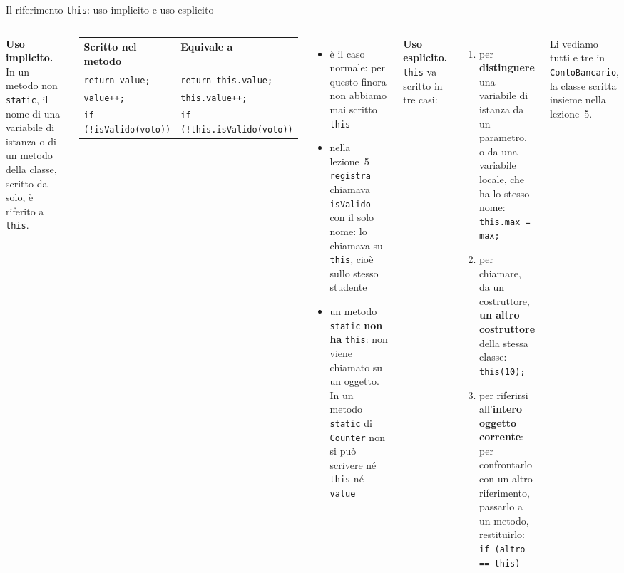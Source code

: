 \documentclass[10pt,aspectratio=169]{beamer}
\begin{document}
\begin{frame}{Il riferimento \texttt{this}: uso implicito e uso esplicito}
\begin{columns}[T]
\small
\textbf{Uso implicito.} In un metodo non \texttt{static}, il nome di una variabile di istanza o di un metodo della classe, scritto da solo, è riferito a \texttt{this}.

\begin{center}
\footnotesize
\renewcommand{\arraystretch}{1.2}
\begin{tabular}{@{}ll@{}}
\toprule
\textbf{Scritto nel metodo} & \textbf{Equivale a} \\
\midrule
\texttt{return value;} & \texttt{return this.value;} \\
\texttt{value++;} & \texttt{this.value++;} \\
\texttt{if (!isValido(voto))} & \texttt{if (!this.isValido(voto))} \\
\bottomrule
\end{tabular}
\end{center}

\begin{itemize}\itemsep=3pt
    \item è il caso normale: per questo finora non abbiamo mai scritto \texttt{this}
    \item nella lezione~5 \texttt{registra} chiamava \texttt{isValido} con il solo nome: lo chiamava su \texttt{this}, cioè sullo stesso studente
    \item un metodo \texttt{static} \textbf{non ha} \texttt{this}: non viene chiamato su un oggetto. In un metodo \texttt{static} di \texttt{Counter} non si può scrivere né \texttt{this} né \texttt{value}
\end{itemize}

\small
\textbf{Uso esplicito.} \texttt{this} va scritto in tre casi:
\begin{enumerate}\itemsep=5pt
    \item per \textbf{distinguere} una variabile di istanza da un parametro, o da una variabile locale, che ha lo stesso nome:\\ \texttt{this.max = max;}
    \item per chiamare, da un costruttore, \textbf{un altro costruttore} della stessa classe:\\ \texttt{this(10);}
    \item per riferirsi all'\textbf{intero oggetto corrente}: per confrontarlo con un altro riferimento, passarlo a un metodo, restituirlo:\\ \texttt{if (altro == this)}
\end{enumerate}

\vspace{0.2cm}
Li vediamo tutti e tre in \texttt{ContoBancario}, la classe scritta insieme nella lezione~5.
\end{columns}
\end{frame}
\end{document}
